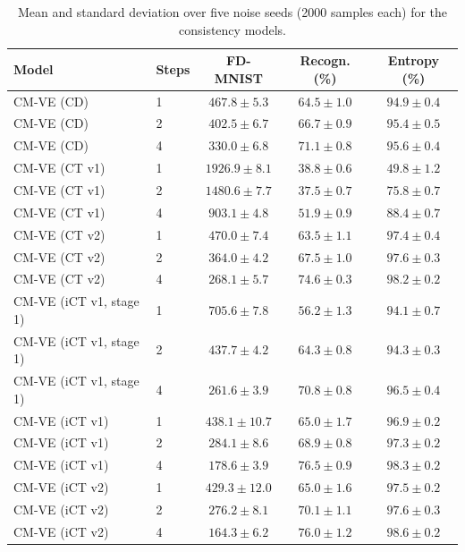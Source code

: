 \documentclass{article}
\begin{document}
\begin{table}[H]
  \caption{Mean and standard deviation over five noise seeds (2000 samples each)
  for the consistency models.}
  \label{tab:variability}
  \centering
  \footnotesize
  \begin{tabular}{llccc}
    \toprule
    Model & Steps & FD-MNIST & Recogn. (\%) & Entropy (\%) \\
    \midrule
    CM-VE (CD) & 1 & $467.8 \pm 5.3$ & $64.5 \pm 1.0$ & $94.9 \pm 0.4$ \\
    CM-VE (CD) & 2 & $402.5 \pm 6.7$ & $66.7 \pm 0.9$ & $95.4 \pm 0.5$ \\
    CM-VE (CD) & 4 & $330.0 \pm 6.8$ & $71.1 \pm 0.8$ & $95.6 \pm 0.4$ \\
    \midrule
    CM-VE (CT v1) & 1 & $1926.9 \pm 8.1$ & $38.8 \pm 0.6$ & $49.8 \pm 1.2$ \\
    CM-VE (CT v1) & 2 & $1480.6 \pm 7.7$ & $37.5 \pm 0.7$ & $75.8 \pm 0.7$ \\
    CM-VE (CT v1) & 4 & $903.1 \pm 4.8$ & $51.9 \pm 0.9$ & $88.4 \pm 0.7$ \\
    \midrule
    CM-VE (CT v2) & 1 & $470.0 \pm 7.4$ & $63.5 \pm 1.1$ & $97.4 \pm 0.4$ \\
    CM-VE (CT v2) & 2 & $364.0 \pm 4.2$ & $67.5 \pm 1.0$ & $97.6 \pm 0.3$ \\
    CM-VE (CT v2) & 4 & $268.1 \pm 5.7$ & $74.6 \pm 0.3$ & $98.2 \pm 0.2$ \\
    \midrule
    CM-VE (iCT v1, stage 1) & 1 & $705.6 \pm 7.8$ & $56.2 \pm 1.3$ & $94.1 \pm 0.7$ \\
    CM-VE (iCT v1, stage 1) & 2 & $437.7 \pm 4.2$ & $64.3 \pm 0.8$ & $94.3 \pm 0.3$ \\
    CM-VE (iCT v1, stage 1) & 4 & $261.6 \pm 3.9$ & $70.8 \pm 0.8$ & $96.5 \pm 0.4$ \\
    \midrule
    CM-VE (iCT v1) & 1 & $438.1 \pm 10.7$ & $65.0 \pm 1.7$ & $96.9 \pm 0.2$ \\
    CM-VE (iCT v1) & 2 & $284.1 \pm 8.6$ & $68.9 \pm 0.8$ & $97.3 \pm 0.2$ \\
    CM-VE (iCT v1) & 4 & $178.6 \pm 3.9$ & $76.5 \pm 0.9$ & $98.3 \pm 0.2$ \\
    \midrule
    CM-VE (iCT v2) & 1 & $429.3 \pm 12.0$ & $65.0 \pm 1.6$ & $97.5 \pm 0.2$ \\
    CM-VE (iCT v2) & 2 & $276.2 \pm 8.1$ & $70.1 \pm 1.1$ & $97.6 \pm 0.3$ \\
    CM-VE (iCT v2) & 4 & $164.3 \pm 6.2$ & $76.0 \pm 1.2$ & $98.6 \pm 0.2$ \\

\end{tabular}
\end{table}
\end{document}
